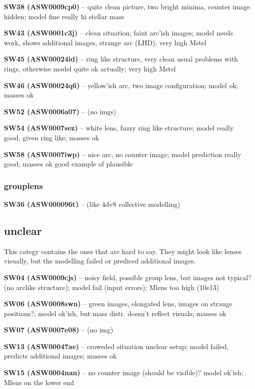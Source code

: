\documentclass[fleqn,usenatbib]{mnras}
\newcommand{\lenstitle}[1]{\noindent\textbf{#1} --}
\begin{document}
\lenstitle{SW38 (ASW0009cp0)} 
  quite clean picture, two bright minima, counter image hidden;
  model fine
  really hi stellar mass
  
\lenstitle{SW43 (ASW0001c3j)} 
  clean situation, faint arc'ish images;
  model needs work, shows additional images, strange arc (LHD);
  very high Mstel
  
\lenstitle{SW45 (ASW00024id)}
  ring like structure, very clean
  usual problems with rings, otherwise model quite ok actually;
  very high Mstel
  
\lenstitle{SW46 (ASW00024q6)} 
  yellow'ish arc, two image configuration;
  model ok;
  masses ok
  
\lenstitle{SW52 (ASW0006a07)} 
  (no imgs)
  
\lenstitle{SW54 (ASW0007sez)} 
  white lens, fuzzy ring like structure;
  model really good, given ring like;
  masses ok
  
\lenstitle{SW58 (ASW0007iwp)} 
  nice arc, no counter image;
  model prediction really good;
  masses ok
  good example of plausible

\subsubsection{grouplens}

\lenstitle{SW36 (ASW000096t)}
(like 4dv8 collective modelling)

\subsection{unclear}

This categy contains the ones that are hard to say.
They might look like lenses visually, but the modelling failed or prediced additional images.



\lenstitle{SW04 (ASW0009cjs)} 
  noisy field, possible group lens, but images not typical? (no arclike structure);
  model fail (input errors);
  Mlens too high (10e13)
  
\lenstitle{SW06 (ASW0008swn)}
  green images, elongated lens, images on strange positions?;
  model ok'ish, but mass distr. doesn't reflect visuals;
  masses ok
  
\lenstitle{SW07 (ASW0007e08)} 
  (no img)
  
\lenstitle{SW13 (ASW00047ae)} 
  croweded situation unclear setup;
  model failed, predicts additional images;
  masses ok
  
\lenstitle{SW15 (ASW0004nan)} 
  no counter image (should be visible)?
  model ok'ish;
  Mlens on the lower end
  
\end{document}
